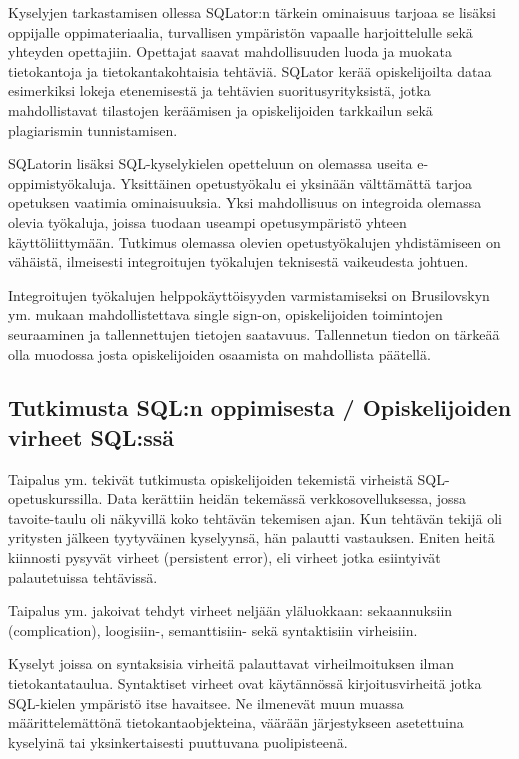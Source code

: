 \documentclass[finnish,twoside,openright]{HYgraduMLDS}
\begin{document}
Kyselyjen tarkastamisen ollessa SQLator:n tärkein ominaisuus tarjoaa se lisäksi oppijalle oppimateriaalia, turvallisen ympäristön vapaalle harjoittelulle sekä yhteyden opettajiin. Opettajat saavat mahdollisuuden luoda ja muokata tietokantoja ja tietokantakohtaisia tehtäviä. SQLator kerää opiskelijoilta dataa esimerkiksi lokeja etenemisestä ja tehtävien suoritusyrityksistä, jotka mahdollistavat tilastojen keräämisen ja opiskelijoiden tarkkailun sekä plagiarismin tunnistamisen.

SQLatorin lisäksi SQL-kyselykielen opetteluun on olemassa useita e-oppimistyökaluja. Yksittäinen opetustyökalu ei yksinään välttämättä tarjoa opetuksen vaatimia ominaisuuksia. Yksi mahdollisuus on integroida olemassa olevia työkaluja, joissa tuodaan useampi opetusympäristö yhteen käyttöliittymään. Tutkimus olemassa olevien opetustyökalujen yhdistämiseen on vähäistä, ilmeisesti integroitujen työkalujen teknisestä vaikeudesta johtuen\cite{Brusilovsky:2010:LSP:1656255.1656257}.

Integroitujen työkalujen helppokäyttöisyyden varmistamiseksi on Brusilovskyn ym. \cite{Brusilovsky:2010:LSP:1656255.1656257} mukaan mahdollistettava single sign-on, opiskelijoiden toimintojen seuraaminen ja tallennettujen tietojen saatavuus. Tallennetun tiedon on tärkeää olla muodossa josta opiskelijoiden osaamista on mahdollista päätellä.


\subsection{Tutkimusta SQL:n oppimisesta / Opiskelijoiden virheet SQL:ssä}

Taipalus ym. \cite{Taipalus:2019:EFS:3287324.3287359} tekivät tutkimusta opiskelijoiden tekemistä virheistä SQL-opetuskurssilla. Data kerättiin heidän tekemässä verkkosovelluksessa, jossa tavoite-taulu oli näkyvillä koko tehtävän tekemisen ajan. Kun tehtävän tekijä oli yritysten jälkeen tyytyväinen kyselyynsä, hän palautti vastauksen. Eniten heitä kiinnosti pysyvät virheet (persistent error), eli virheet jotka esiintyivät palautetuissa tehtävissä. 

Taipalus ym. \cite{Taipalus:2019:EFS:3287324.3287359} jakoivat tehdyt virheet neljään yläluokkaan: sekaannuksiin (complication), loogisiin-, semanttisiin- sekä syntaktisiin virheisiin. 

Kyselyt joissa on syntaksisia virheitä palauttavat virheilmoituksen ilman tietokantataulua. Syntaktiset virheet ovat käytännössä kirjoitusvirheitä jotka SQL-kielen ympäristö itse havaitsee. Ne ilmenevät muun muassa määrittelemättönä tietokantaobjekteina, väärään järjestykseen asetettuina kyselyinä tai yksinkertaisesti puuttuvana puolipisteenä.
\end{document}
